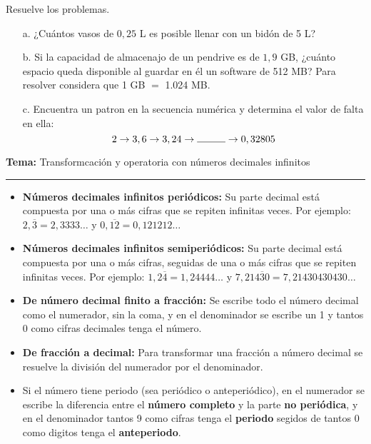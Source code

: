 \documentclass[spanish,letterpaper, 11pt, addpoints, answers]{exam}
\begin{document}
\begin{questions}
\begin{itemize}
        \end{itemize}
        
      
\newpage
      \question Resuelve los problemas.

\begin{itemize}
  \item[a.] ¿Cuántos vasos de $0,25$ L es posible llenar con un bidón de 5 L?
  \item[b.] Si la capacidad de almacenajo de un pendrive es de $1,9$ GB, ¿cuánto espacio queda disponible al guardar en él un software de 512 MB? Para resolver considera que 1 GB $=$ 1.024 MB.
  \item[c.] Encuentra un patron en la secuencia numérica y determina el valor de falta en ella:
  $$2\rightarrow 3,6\rightarrow 3,24\rightarrow \rule{1cm}{0.4pt}\rightarrow 0,32805$$ 
\end{itemize}  



  \parbox{6in}{
    \textbf{Tema:} Transformcación y operatoria con números decimales infinitos}
    \vspace{0.15in}
    \hrule
    
    \begin{itemize}
      \item \textbf{Números decimales infinitos periódicos:} Su parte decimal está compuesta por una o más cifras que se repiten infinitas veces. Por ejemplo: $2,\overline{3}=2,3333\ldots$ y $0,\overline{12}=0,121212\ldots$
      
      \item \textbf{Números decimales infinitos semiperiódicos:} Su parte decimal está compuesta por una o más cifras, seguidas de una o más cifras que se repiten infinitas veces. Por ejemplo: $1,2\overline{4}=1,24444\ldots$ y $7,21\overline{430}=7,21430430430\ldots$
      \item \textbf{De número decimal finito a fracción:} Se escribe todo el número decimal como el numerador, sin la coma, y en el denominador se escribe un 1 y tantos 0 como cifras decimales tenga el número.
      \item \textbf{De fracción a decimal:} Para transformar una fracción a número decimal se resuelve la división del numerador por el denominador.
      \item Si el número tiene periodo (sea periódico o anteperiódico), en el numerador se escribe la diferencia entre el \textbf{número completo} y la parte \textbf{no periódica}, y en el denominador tantos 9 como cifras tenga el \textbf{periodo} segidos de tantos 0 como digitos tenga el \textbf{anteperiodo}.
    \end{itemize}


\end{questions}
\end{document}
